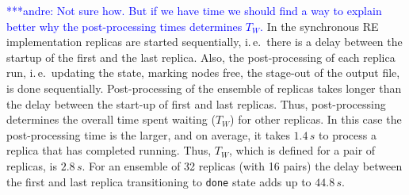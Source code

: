 \documentclass{rspublic}
\newcommand{\alnote}[1]{ {\textcolor{blue} { ***andre: #1 }}}
\newcommand{\athotanote}[1]{ {\textcolor{green} { ***athota: #1 }}}
\newcommand{\alnote}[1]{}
\newcommand{\athotanote}[1]{}
\begin{document}
\alnote{Not sure how. But if we have time we should find a way
to explain better why the post-processing times determines
$T_W$.}
In the synchronous RE implementation replicas are started
sequentially, i.\,e.\ there is a delay between the startup of the
first and the last replica. Also, the post-processing of each replica
run, i.\,e.\ updating the state, marking nodes free, the stage-out of
the output file, is done sequentially. Post-processing of the ensemble 
of replicas takes longer than the delay between the start-up of first 
and last replicas. Thus, post-processing determines the overall time 
spent waiting ($T_W$) for other replicas.
In this case the post-processing time is the larger, and on average,
it takes $1.4\,s$
to process a replica that has completed running. Thus, $T_{W}$, which
is defined for a pair of replicas, is $2.8\,s$. For an ensemble of 32
replicas (with 16 pairs) the delay between the first and last replica
transitioning to \texttt{done} state adds up to $44.8\,s$.  






\end{document}
